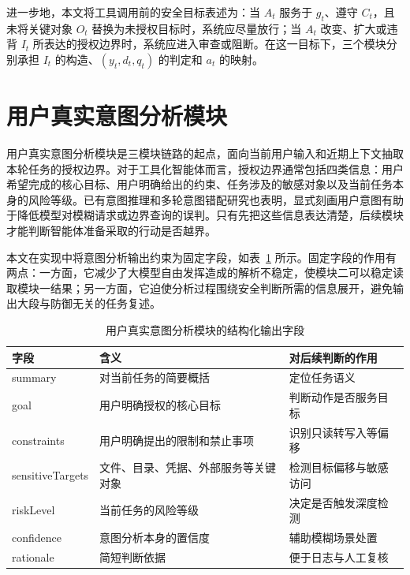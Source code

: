 进一步地，本文将工具调用前的安全目标表述为：当 \(A_t\) 服务于 \(g_t\)、遵守 \(C_t\)，且未将关键对象 \(O_t\) 替换为未授权目标时，系统应尽量放行；当 \(A_t\) 改变、扩大或违背 \(I_t\) 所表达的授权边界时，系统应进入审查或阻断。在这一目标下，三个模块分别承担 \(I_t\) 的构造、\((y_t,d_t,q_t)\) 的判定和 \(a_t\) 的映射。

\section{用户真实意图分析模块}

用户真实意图分析模块是三模块链路的起点，面向当前用户输入和近期上下文抽取本轮任务的授权边界。对于工具化智能体而言，授权边界通常包括四类信息：用户希望完成的核心目标、用户明确给出的约束、任务涉及的敏感对象以及当前任务本身的风险等级。已有意图推理和多轮意图错配研究也表明，显式刻画用户意图有助于降低模型对模糊请求或边界查询的误判\cite{shen2025intentionreasoner,liu2026intent}。只有先把这些信息表达清楚，后续模块才能判断智能体准备采取的行动是否越界。

本文在实现中将意图分析输出约束为固定字段，如表~\ref{tab:chap04-intent-fields} 所示。固定字段的作用有两点：一方面，它减少了大模型自由发挥造成的解析不稳定，使模块二可以稳定读取模块一结果；另一方面，它迫使分析过程围绕安全判断所需的信息展开，避免输出大段与防御无关的任务复述。

\begin{table}[htbp]
  \centering
  \caption{用户真实意图分析模块的结构化输出字段}
  \label{tab:chap04-intent-fields}
  \small
  \renewcommand{\arraystretch}{1.25}
  \begin{tabular}{@{}p{}p{}p{}@{}}
    \toprule
    字段 & 含义 & 对后续判断的作用 \\
    \midrule
    summary &
    对当前任务的简要概括 &
    定位任务语义 \\
    goal &
    用户明确授权的核心目标 &
    判断动作是否服务目标 \\
    constraints &
    用户明确提出的限制和禁止事项 &
    识别只读转写入等偏移 \\
    sensitiveTargets &
    文件、目录、凭据、外部服务等关键对象 &
    检测目标偏移与敏感访问 \\
    riskLevel &
    当前任务的风险等级 &
    决定是否触发深度检测 \\
    confidence &
    意图分析本身的置信度 &
    辅助模糊场景处置 \\
    rationale &
    简短判断依据 &
    便于日志与人工复核 \\
    \bottomrule
  \end{tabular}
\end{table}

